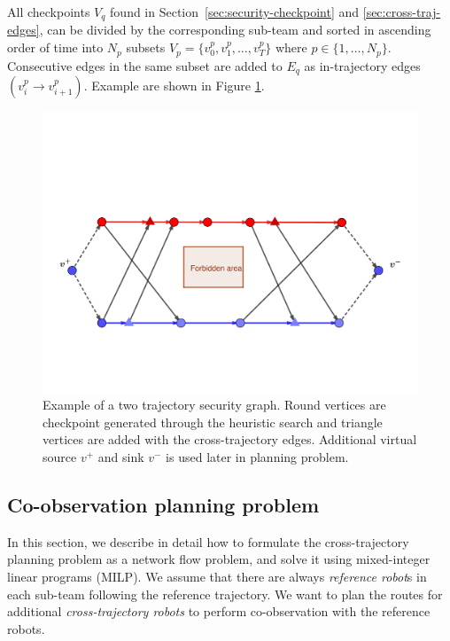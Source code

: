 \documentclass[journal]{IEEEtran}  %
\begin{document}
All checkpoints $V_{q}$ found in Section~\ref{sec:security-checkpoint} and \ref{sec:cross-traj-edges}, can be divided by the corresponding sub-team and sorted in ascending order of time into $N_{p}$ subsets $V_{p}=\{v^{p}_{0}, v^{p}_{1}, \dots , v^{p}_{T}\}$ where $p\in \{1,\dots, N_{p}\}$. Consecutive edges in the same subset are added to $E_{q}$ as in-trajectory edges $(v^{p}_{i}\rightarrow v^{p}_{i+1} )$. Example are shown in Figure \ref{fig:security-graph-generate}.
\begin{figure}[htbp]
\begin{center}
\includegraphics[width=0.6\linewidth]{security_graph}
\caption{Example of a two trajectory security graph. Round vertices are checkpoint generated through the heuristic search and triangle vertices are added with the cross-trajectory edges. Additional virtual source $v^{+}$ and sink $v^{-}$ is used later in planning problem.}
\label{fig:security-graph-generate}
\end{center}
\end{figure}


\subsection{Co-observation planning problem}
In this section, we describe in detail how to formulate the cross-trajectory planning problem as a network flow problem, and solve it using mixed-integer linear programs (MILP). We assume that there are always \emph{reference robot}s in each sub-team following the reference trajectory.  We want to plan the routes for additional \emph{cross-trajectory robots} to perform co-observation with the reference robots. 
\end{document}
